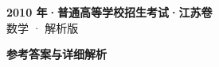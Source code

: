 \documentclass[zihao=-4, a4paper]{ctexart}
\begin{document}
\begin{center}
  {\Large\bfseries 2010 年·普通高等学校招生考试·江苏卷}\\[4pt]
  {\large 数学 · 解析版}
\end{center}
\medskip
{}

\clearpage
{}
\begin{center}{\Large\bfseries 参考答案与详细解析}\end{center}
\medskip

\end{document}
